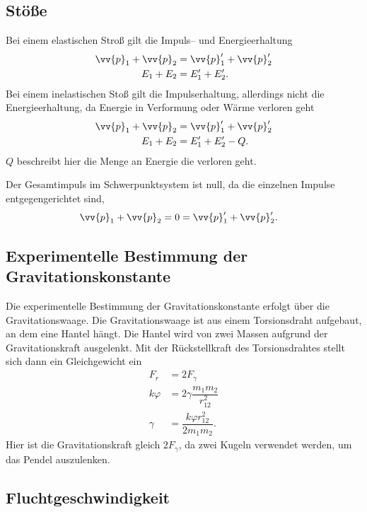 \subsection{Stöße}
Bei einem elastischen Stroß gilt die Impuls-- und Energieerhaltung
\begin{align} 
        \vv{p}_1+\vv{p}_2&=\vv{p}_1'+\vv{p}_2'\\
        E_1+E_2&=E_1'+E_2'
.\end{align} 
Bei einem inelastischen Stoß gilt die Impulserhaltung, allerdings nicht die Energieerhaltung, da Energie in Verformung oder Wärme verloren geht
\begin{align} 
        \vv{p}_1+\vv{p}_2&=\vv{p}_1'+\vv{p}_2'\\
        E_1+E_2&=E_1'+E_2'-Q
.\end{align} 
$Q$ beschreibt hier die Menge an Energie die verloren geht.\par
Der Gesamtimpuls im Schwerpunktsystem ist null, da die einzelnen Impulse entgegengerichtet sind,
\begin{align} 
        \vv{p}_1+\vv{p}_2&=0=\vv{p}_1'+\vv{p}_2'
.\end{align} 

\subsection{Experimentelle Bestimmung der Gravitationskonstante}
Die experimentelle Bestimmung der Gravitationskonstante erfolgt über die Gravitationswaage. 
Die Gravitationswaage ist aus einem Torsionsdraht aufgebaut, an dem eine Hantel hängt.
Die Hantel wird von zwei Massen aufgrund der Gravitationskraft ausgelenkt.
Mit der Rückstellkraft des Torsionsdrahtes stellt sich dann ein Gleichgewicht ein
\begin{align} 
        F_r&=2F_\gamma \\
        k\varphi &=2\gamma \dfrac{m_1m_2}{r_{12}^2}\\
        \gamma &=\dfrac{k\varphi r_{12}^2}{2m_1m_2}
.\end{align} 
Hier ist die Gravitationskraft gleich $2F_\gamma $, da zwei Kugeln verwendet werden, um das Pendel auszulenken.

\subsection{Fluchtgeschwindigkeit}


